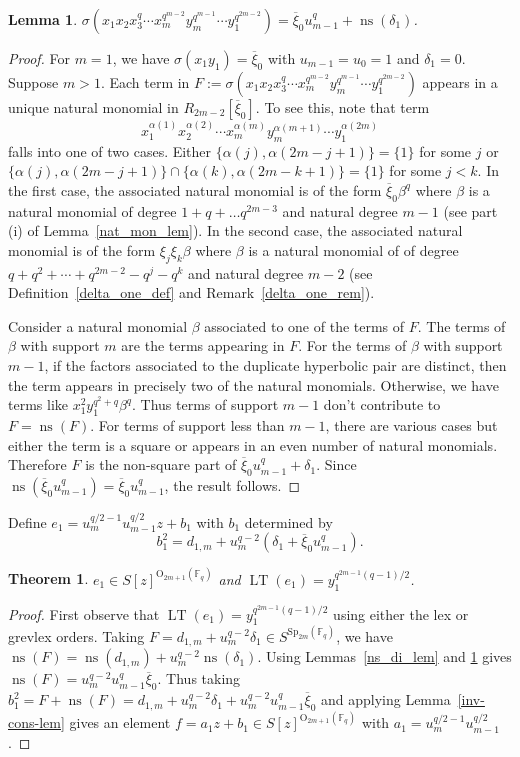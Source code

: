\documentclass{amsart}
\newtheorem{theorem}[subsection]{Theorem}
\newtheorem{lemma}[subsection]{Lemma}
\newcommand{\field}{\mathbb{F}}
\newcommand{\syp}[2]{{{\text{Sp}_{{#1}}(\field_{#2})}}}
\newcommand{\orth}[2]{{{\text{O}_{{#1}}(\field_{#2})}}}
\DeclareMathOperator{\ns}{ns}
\DeclareMathOperator{\lt}{LT}
\begin{document}
\begin{lemma} \label{ns_sig_lem} 
$\sigma(x_1 x_2 x_3^q\cdots x_m^{q^{m-2}}y_m^{q^{m-1}}\cdots y_1^{q^{2m-2}})=\overline{\xi}_0u_{m-1}^q+\ns(\delta_1)$.
\end{lemma}
\begin{proof} For $m=1$, we have $\sigma(x_1y_1)=\overline{\xi}_0$
with $u_{m-1}=u_0=1$ and $\delta_1=0$. Suppose $m>1$.
Each term in $F:=\sigma(x_1 x_2 x_3^q\cdots x_m^{q^{m-2}}y_m^{q^{m-1}}\cdots y_1^{q^{2m-2}})$ 
appears in a unique natural monomial in $R_{2m-2}[\overline{\xi}_0]$.
To see this, note that term $$x_1^{\alpha(1)}x_2^{\alpha(2)}\cdots x_m^{\alpha(m)}y_m^{\alpha(m+1)}
\cdots y_1^{\alpha(2m)}$$ falls into one of two cases.
Either $\{\alpha(j),\alpha(2m-j+1)\}=\{1\}$ for some $j$
or $\{\alpha(j),\alpha(2m-j+1)\}\cap \{\alpha(k),\alpha(2m-k+1)\}=\{1\}$
for some $j<k$. In the first case, the associated natural monomial
is of the form $\overline{\xi}_0\beta^q$ where $\beta$ is a
natural monomial of degree $1+q+\ldots q^{2m-3}$ and natural degree $m-1$
(see part (i) of Lemma~\ref{nat_mon_lem}).
In the second case, the associated natural monomial is of the form 
$\xi_j\xi_k\beta$ where $\beta$ is a natural monomial of
of degree $q+q^2+\cdots +q^{2m-2}-q^j-q^k$ and natural degree $m-2$
(see Definition~\ref{delta_one_def} and Remark~\ref{delta_one_rem}).

Consider a natural monomial $\beta$ associated to one of the terms of $F$. The terms of $\beta$ with support $m$ are the terms appearing in $F$.
For the terms of $\beta$ with support $m-1$, if the factors associated to the duplicate hyperbolic pair are distinct, then the term appears in precisely two of the natural monomials.
Otherwise, we have terms like $x_1^2y_1^{q^2+q}\beta^q$. Thus terms of support $m-1$ don't contribute to $F=\ns(F)$.
For terms of support less than $m-1$, there are various cases but either the term is a square or appears in an even number of natural monomials. 
Therefore $F$ is the non-square part of 
$\overline{\xi}_0u_{m-1}^q+\delta_1$. 
Since $\ns(\overline{\xi}_0u_{m-1}^q)=\overline{\xi}_0u_{m-1}^q$,
the result follows.
\end{proof}

Define $e_1=u_m^{q/2-1}u_{m-1}^{q/2}z+b_1$  with $b_1$ determined by $$b_1^2=d_{1,m}+u_m^{q-2}(\delta_1+\overline{\xi}_0 u_{m-1}^q).$$

\begin{theorem} $e_1\in S[z]^{\orth{2m+1}{q}}$ and $\lt(e_1)=y_1^{q^{2m-1}(q-1)/2}$.
\end{theorem}
\begin{proof} First observe that $\lt(e_1)=y_1^{q^{2m-1}(q-1)/2}$ using either the lex or grevlex orders.
Taking $F=d_{1,m}+u_m^{q-2}\delta_1\in S^{\syp{2m}{q}}$, we have $\ns(F)=\ns(d_{1,m})+u_m^{q-2}\ns(\delta_1)$.
Using Lemmas~\ref{ns_di_lem} and \ref{ns_sig_lem} gives $\ns(F)=u_m^{q-2}u_{m-1}^q\overline{\xi}_0$.
Thus taking $b_1^2=F+\ns(F)=d_{1,m}+u_m^{q-2}\delta_1+u_m^{q-2}u_{m-1}^q\overline{\xi}_0$ and applying Lemma~\ref{inv-cons-lem}
gives an element $f=a_1z+b_1\in S[z]^{\orth{2m+1}{q}}$ with $a_1=u_m^{q/2-1}u_{m-1}^{q/2}$.
\end{proof}
\end{document}
